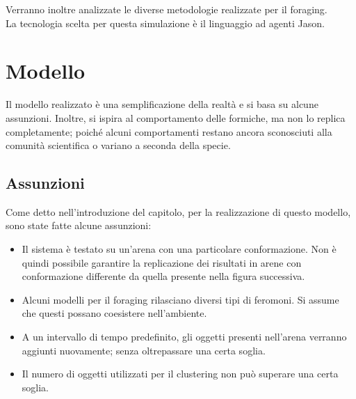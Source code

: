 \documentclass[12pt,a4paper,openright,twoside]{report}
\begin{document}
Verranno inoltre analizzate le diverse metodologie realizzate per il foraging.\\
La tecnologia scelta per questa simulazione è il linguaggio ad agenti Jason.
	\clearpage{\pagestyle{empty}\cleardoublepage}
	\tableofcontents                        %
	\rhead[\fancyplain{}{\bfseries\leftmark}]{\fancyplain{}{\bfseries\thepage}}
	\clearpage{\pagestyle{empty}\cleardoublepage}
	\clearpage{\pagestyle{empty}\cleardoublepage}
	\clearpage{\pagestyle{empty}\cleardoublepage}
	\chapter{Modello}                %
	\lhead[\fancyplain{}{\bfseries\thepage}]{\fancyplain{}{\bfseries\rightmark}}

Il modello realizzato è una semplificazione della realtà e si basa su alcune assunzioni. Inoltre, si ispira al comportamento delle formiche, ma non lo replica completamente; poiché alcuni comportamenti restano ancora sconosciuti alla comunità scientifica o variano a seconda della specie.

\section{Assunzioni}

Come detto nell'introduzione del capitolo, per la realizzazione di questo modello, sono state fatte alcune assunzioni:

\begin{itemize}
	\item Il sistema è testato su un'arena con una particolare conformazione. Non è quindi possibile garantire la replicazione dei risultati in arene con conformazione differente da quella presente nella figura successiva.
	\item Alcuni modelli per il foraging rilasciano diversi tipi di feromoni. Si assume che questi possano coesistere nell'ambiente.
	\item A un intervallo di tempo predefinito, gli oggetti presenti nell'arena verranno aggiunti nuovamente; senza  oltrepassare una certa soglia.
	\item Il numero di oggetti utilizzati per il clustering non può superare una certa soglia.
\end{itemize}
\end{document}
